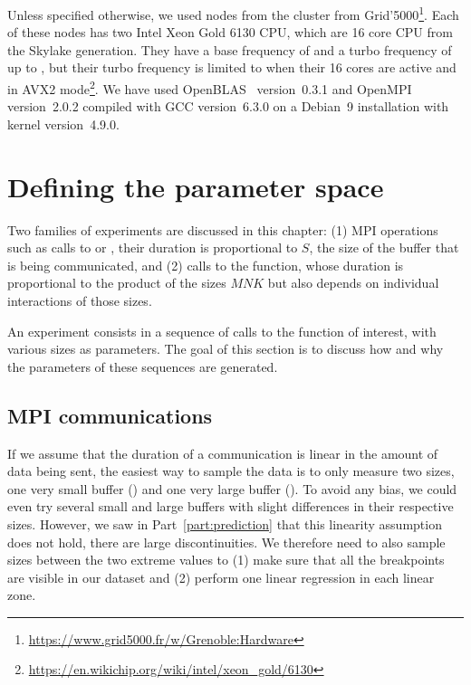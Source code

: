         Unless specified otherwise, we used nodes from the \dahu cluster from
        Grid'5000\footnote{\url{https://www.grid5000.fr/w/Grenoble:Hardware}}. Each of these nodes has two Intel Xeon
        Gold 6130 CPU, which are 16 core CPU from the Skylake generation. They have a base frequency of
         and a turbo frequency of up to , but their turbo frequency is
        limited to  when their 16 cores are active and in AVX2
        mode\footnote{\url{https://en.wikichip.org/wiki/intel/xeon\_gold/6130}}. We have used
        OpenBLAS~\cite{openblas} version~0.3.1 and OpenMPI~\cite{openmpi} version~2.0.2 compiled with GCC version~6.3.0
        on a Debian~9 installation with kernel version~4.9.0.

    \section{Defining the parameter space}%
    \label{sec:parameter_space}

        Two families of experiments are discussed in this chapter: (1) MPI operations such as calls to
        \recv or \send, their duration is proportional to \(S\), the size of the buffer that is
        being communicated, and (2) calls to the \dgemm function, whose duration is proportional to the product
        of the sizes \(MNK\) but also depends on individual interactions of those sizes.

        An experiment consists in a sequence of calls to the function of interest, with various sizes as parameters. The
        goal of this section is to discuss how and why the parameters of these sequences are generated.

        \subsection{MPI communications}%

            If we assume that the duration of a communication is linear in the amount of data being sent, the easiest
            way to sample the data is to only measure two sizes, one very small buffer (\eg {}) and one very
            large buffer (\eg {}). To avoid any bias, we could even try several small and large
            buffers with slight differences in their respective sizes. However, we saw in Part~\ref{part:prediction}
            that this linearity assumption does not hold, there are large discontinuities. We therefore need to also
            sample sizes between the two extreme values to (1) make sure that all the breakpoints are visible in our
            dataset and (2) perform one linear regression in each linear zone.

